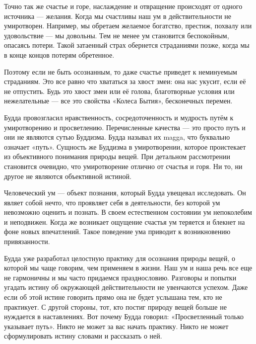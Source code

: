 Точно так же счастье и горе, наслаждение и отвращение происходят от одного источника — желания. Когда мы счастливы наш ум в действительности не умиротворен. Например, мы обретаем желаемое богатство, престиж, похвалу или удовольствие — мы довольны. Тем не менее ум становится беспокойным, опасаясь потери. Такой затаенный страх обернется страданиями позже, когда мы в конце концов потерям обретенное.

Поэтому если не быть осознанным, то даже счастье приведет к неминуемым страданиям. Это все равно что хвататься за хвост змеи: она нас укусит, если её не отпустить. Будь это хвост змеи или её голова, благотворные условия или нежелательные — все это свойства «Колеса Бытия», бесконечных перемен.

Будда провозгласил нравственность, сосредоточенность и мудрость путём к умиротворению и просветлению. Перечисленные качества — это просто путь и они не являются сутью Буддизма. Будда называл их magga, что буквально означает «путь». Сущность же Буддизма в умиротворении, которое проистекает из объективного понимания природы вещей. При детальном рассмотрении становится очевидно, что умиротворение отлично от счастья и горя. Ни то, ни другое не являются объективной истиной.

Человеческий ум — объект познания, который Будда увещевал исследовать. Он являет собой нечто, что проявляет себя в деятельности, без которой ум невозможно оценить и познать. В своем естественном состоянии ум непоколебим и неподвижен. Когда же возникает ощущение счастья ум теряется и блекнет на фоне новых впечатлений. Такое поведение ума приводит к возникновению привязанности.

Будда уже разработал целостную практику для осознания природы вещей, о которой мы чаще говорим, чем применяем в жизни. Наш ум и наша речь все еще не гармоничны и мы часто придаемся празднословию. Разговоры и попытки угадать истину об окружающей действительности не увенчаются успехом. Даже если об этой истине говорить прямо она не будет услышана тем, кто не практикует. С другой стороны, тот, кто постиг природу вещей больше не нуждается в наставлениях. Вот почему Будда говорил: «Просветленный только указывает путь». Никто не может за вас начать практику. Никто не может сформулировать истину словами и рассказать о ней.
